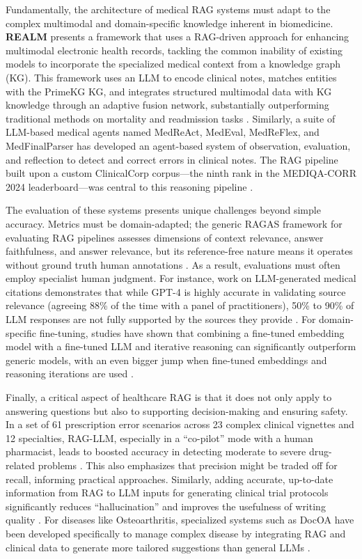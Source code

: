 \documentclass[11pt]{article}
\begin{document}
Fundamentally, the architecture of medical RAG systems must adapt to the complex multimodal and domain-specific knowledge inherent in biomedicine. \textbf{REALM} presents a framework that uses a RAG-driven approach for enhancing multimodal electronic health records, tackling the common inability of existing models to incorporate the specialized medical context from a knowledge graph (KG). This framework uses an LLM to encode clinical notes, matches entities with the PrimeKG KG, and integrates structured multimodal data with KG knowledge through an adaptive fusion network, substantially outperforming traditional methods on mortality and readmission tasks \cite{ref355}. Similarly, a suite of LLM-based medical agents named MedReAct, MedEval, MedReFlex, and MedFinalParser has developed an agent-based system of observation, evaluation, and reflection to detect and correct errors in clinical notes. The RAG pipeline built upon a custom ClinicalCorp corpus---the ninth rank in the MEDIQA-CORR 2024 leaderboard---was central to this reasoning pipeline \cite{ref383}.

The evaluation of these systems presents unique challenges beyond simple accuracy. Metrics must be domain-adapted; the generic RAGAS framework for evaluating RAG pipelines assesses dimensions of context relevance, answer faithfulness, and answer relevance, but its reference-free nature means it operates without ground truth human annotations \cite{ref26}. As a result, evaluations must often employ specialist human judgment. For instance, work on LLM-generated medical citations demonstrates that while GPT-4 is highly accurate in validating source relevance (agreeing 88\% of the time with a panel of practitioners), 50\% to 90\% of LLM responses are not fully supported by the sources they provide \cite{ref384}. For domain-specific fine-tuning, studies have shown that combining a fine-tuned embedding model with a fine-tuned LLM and iterative reasoning can significantly outperform generic models, with an even bigger jump when fine-tuned embeddings and reasoning iterations are used \cite{ref71}.

Finally, a critical aspect of healthcare RAG is that it does not only apply to answering questions but also to supporting decision-making and ensuring safety. In a set of 61 prescription error scenarios across 23 complex clinical vignettes and 12 specialties, RAG-LLM, especially in a ``co-pilot'' mode with a human pharmacist, leads to boosted accuracy in detecting moderate to severe drug-related problems \cite{ref385}. This also emphasizes that precision might be traded off for recall, informing practical approaches. Similarly, adding accurate, up-to-date information from RAG to LLM inputs for generating clinical trial protocols significantly reduces ``hallucination'' and improves the usefulness of writing quality \cite{ref386}. For diseases like Osteoarthritis, specialized systems such as DocOA have been developed specifically to manage complex disease by integrating RAG and clinical data to generate more tailored suggestions than general LLMs \cite{ref387}.
\end{document}
